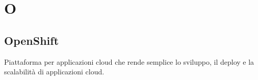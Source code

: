 \section*{O}
\markright{}

\subsection*{OpenShift}
Piattaforma per applicazioni cloud che rende semplice lo sviluppo, il deploy e la scalabilità di applicazioni cloud.